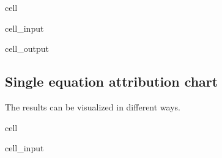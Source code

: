 \documentclass[letterpaper,10pt,english]{jupyterBook}
\begin{document}
\begin{sphinxuseclass}{cell}\begin{sphinxVerbatimInput}

\begin{sphinxuseclass}{cell_input}
\begin{sphinxVerbatim}[commandchars=\\\{\}]
  
\end{sphinxVerbatim}

\end{sphinxuseclass}\end{sphinxVerbatimInput}
\begin{sphinxVerbatimOutput}

\begin{sphinxuseclass}{cell_output}
\noindent{}

\end{sphinxuseclass}\end{sphinxVerbatimOutput}

\end{sphinxuseclass}

\subsection{Single equation attribution chart}
\label{\detokenize{content/06_ModelAnalytics/Attribution:single-equation-attribution-chart}}
\sphinxAtStartPar
The results can be visualized in different ways.

\begin{sphinxuseclass}{cell}\begin{sphinxVerbatimInput}

\begin{sphinxuseclass}{cell_input}
\begin{sphinxVerbatim}[commandchars=\\\{\}]
 
\end{sphinxVerbatim}

\end{sphinxuseclass}\end{sphinxVerbatimInput}

\end{sphinxuseclass}
\end{document}
